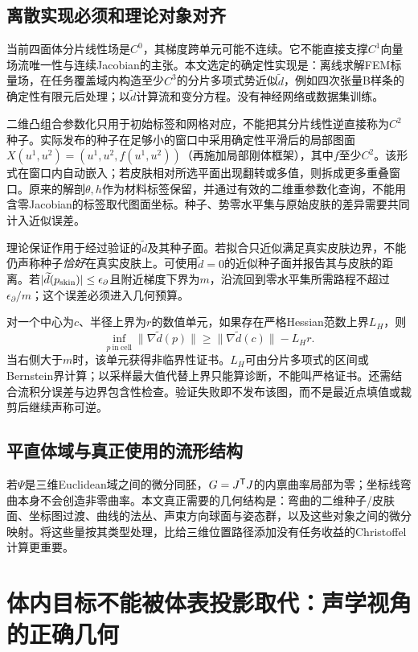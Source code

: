\documentclass[UTF8,11pt,a4paper,fontset=fandol]{ctexart}
\numberwithin{equation}{section}
\theoremstyle{plain}
\theoremstyle{definition}
\theoremstyle{remark}
\begin{document}
\subsection{离散实现必须和理论对象对齐}
当前四面体分片线性场是$C^0$，其梯度跨单元可能不连续。它不能直接支撑$C^1$向量场流唯一性与连续Jacobian的主张。本文选定的确定性实现是：离线求解FEM标量场，在任务覆盖域内构造至少$C^3$的分片多项式势近似$\widetilde d$，例如四次张量B样条的确定性有限元后处理；以$\widetilde d$计算流和变分方程。没有神经网络或数据集训练。

二维凸组合参数化只用于初始标签和网格对应，不能把其分片线性逆直接称为$C^2$种子。实际发布的种子在足够小的窗口中采用确定性平滑后的局部图面$X(u^1,u^2)=(u^1,u^2,f(u^1,u^2))$（再施加局部刚体框架），其中$f$至少$C^2$。该形式在窗口内自动嵌入；若皮肤相对所选平面出现翻转或多值，则拆成更多重叠窗口。原来的解剖$\theta,h$作为材料标签保留，并通过有效的二维重参数化查询，不能用含零Jacobian的标签取代图面坐标。种子、势零水平集与原始皮肤的差异需要共同计入近似误差。

理论保证作用于经过验证的$\widetilde d$及其种子面。若拟合只近似满足真实皮肤边界，不能仍声称种子\emph{恰好}在真实皮肤上。可使用$\widetilde d=0$的近似种子面并报告其与皮肤的距离。若$|\widetilde d(p_{\rm skin})|\leq\epsilon_\partial$且附近梯度下界为$m$，沿流回到零水平集所需路程不超过$\epsilon_\partial/m$；这个误差必须进入几何预算。

对一个中心为$c$、半径上界为$r$的数值单元，如果存在严格Hessian范数上界$L_H$，则
\begin{equation}
 \inf_{p\ \mathrm{in\ cell}}\|\nabla\widetilde d(p)\|
 \geq \|\nabla\widetilde d(c)\|-L_Hr.
 \label{eq:gradient-certificate}
\end{equation}
当右侧大于$m$时，该单元获得非临界性证书。$L_H$可由分片多项式的区间或Bernstein界计算；以采样最大值代替上界只能算诊断，不能叫严格证书。还需结合流积分误差与边界包含性检查。验证失败即不发布该图，而不是最近点填值或裁剪后继续声称可逆。

\subsection{平直体域与真正使用的流形结构}
若$\Psi$是三维Euclidean域之间的微分同胚，$G=J^{\mathsf T} J$的内禀曲率局部为零；坐标线弯曲本身不会创造非零曲率。本文真正需要的几何结构是：弯曲的二维种子/皮肤面、坐标图过渡、曲线的法丛、声束方向球面与姿态群，以及这些对象之间的微分映射。将这些量按其类型处理，比给三维位置路径添加没有任务收益的Christoffel计算更重要。

\section{体内目标不能被体表投影取代：声学视角的正确几何}\label{sec:acoustic}
\end{document}
